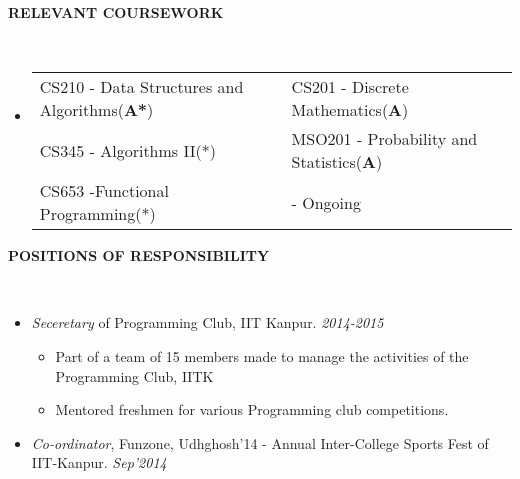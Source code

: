 \documentclass[a4paper,10pt]{article}
\newcommand{\lsep}{-0.5cm}
\newcommand{\resheading}[1]{{\small \colorbox{mygrey}{\begin{minipage}{0.975\textwidth}{\textbf{#1 \vphantom{p\^{E}}}}\end{minipage}}}}
\begin{document}
        \resheading{\textbf{RELEVANT COURSEWORK} }\\[\lsep] \vspace{2mm}
        \begin{itemize}
        \item[]
          \begin{tabular}{p{69mm}@{\hskip 0.25in} p{80mm}} 
            CS210 - Data Structures and Algorithms(\textbf{A*}) & CS201 - Discrete Mathematics(\textbf{A})  \\
            CS345 - Algorithms II(*)             & MSO201 - Probability and Statistics(\textbf{A}) \\
            CS653 -Functional Programming(*)  & \hfill * - Ongoing
          \end{tabular}

        \end{itemize}

        \vspace{-1mm}
        \resheading{\textbf{POSITIONS OF RESPONSIBILITY} }\\[\lsep] \vspace{1mm}
        \begin{itemize} \itemsep -2pt
        \item \textit{Seceretary} of Programming Club, IIT Kanpur. \hfill \textit{2014-2015}
          \vspace{-2mm}\begin{itemize}
          \item Part of a team of 15 members made to manage the activities of the Programming Club, IITK
          \item Mentored freshmen for various Programming club competitions.
          \end{itemize}
        \item \textit{Co-ordinator},
          Funzone, Udhghosh'14 - Annual Inter-College Sports Fest of IIT-Kanpur. \hfill \textit{Sep'2014}
        \end{itemize}\vspace{-\baselineskip}
      
\end{document}
